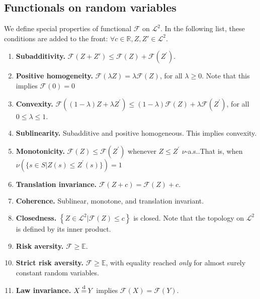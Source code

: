 \subsection{Functionals on random variables}
\begin{defn}\label{defn:risk_functional_properties}
We define special properties of functional \(\mathcal{F}\) on \(\mathscr{L}^2\). In the following list, these conditions are added to the front: $\forall c\in \mathbb{R}, Z, Z'\in \mathscr{L}^2$.
\begin{enumerate}[(1)]
	\item \textbf{Subadditivity.} $\mathcal{F}\left(Z + Z'\right) \leq \mathcal{F}(Z)+ \mathcal{F}\left(Z^{\prime}\right)$.
	\item \textbf{Positive homogeneity.} $\mathcal{F}(\lambda Z)=\lambda \mathcal{F}(Z)$, for all $\lambda \ge 0$. Note that this implies $\mathcal{F}(0) = 0$
	\item \textbf{Convexity.} $\mathcal{F}\left((1-\lambda) Z+\lambda Z^{\prime}\right) \leq(1-\lambda) \mathcal{F}(Z)+\lambda \mathcal{F}\left(Z^{\prime}\right)$, for all $0\le \lambda \le 1$.
	\item \textbf{Sublinearity.} Subadditive and positive homogeneous. This implies convexity.
	\item \textbf{Monotonicity.} $\mathcal{F}(Z) \leq \mathcal{F}\left(Z^{\prime}\right)$ whenever $Z \leq Z^{\prime}$ $\nu$-a.s..\newline That is, when $\nu(\{s \in S | Z(s) \leq Z^{\prime}(s)\})=1$
	\item \textbf{Translation invariance.} $\mathcal{F}(Z+c)=\mathcal{F}(Z)+c$.
	\item \textbf{Coherence.} Sublinear, monotone, and translation invariant.
	\item \textbf{Closedness.} $\left\{Z \in \mathscr{L}^{2} | \mathcal{F}(Z) \leq c\right\}$ is closed. Note that the topology on $\mathscr{L}^{2}$ is defined by its inner product.
	\item \textbf{Risk aversity.} \(\mathcal{F}\ge \mathbb{E}\).
	\item \textbf{Strict risk aversity.} \(\mathcal{F}\ge \mathbb{E}\), with equality reached \textit{only} for almost surely constant random variables.
	\item \textbf{Law invariance.} $X\operatorname*{\stackrel{\text {d}}{=}} Y$ implies $\mathcal{F}(X) = \mathcal{F}(Y)$.
\end{enumerate}
\end{defn}

